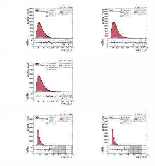 \begin{figure}[!ht]
  \centering
  \includegraphics[width=0.335\textwidth]{analysis_plots/2016_zjj/cr_vjets_l/dijet_j1_pt.pdf} \hspace{-10pt}
  \includegraphics[width=0.335\textwidth]{analysis_plots/2017_zjj/cr_vjets_l/dijet_j1_pt.pdf} \hspace{-10pt}
  \includegraphics[width=0.335\textwidth]{analysis_plots/2018_zjj/cr_vjets_l/dijet_j1_pt.pdf} \hspace{-10pt} \\
  \includegraphics[width=0.335\textwidth]{analysis_plots/2016_zjj/cr_vjets_l/dijet_j2_pt.pdf} \hspace{-10pt}
  \includegraphics[width=0.335\textwidth]{analysis_plots/2017_zjj/cr_vjets_l/dijet_j2_pt.pdf} \hspace{-10pt}

\end{figure}

